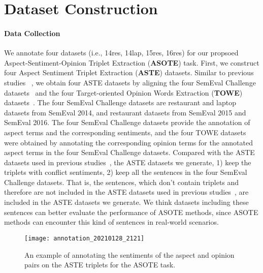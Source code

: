 \documentclass[11pt]{article}
\begin{document}
\section{Dataset Construction}
\paragraph{Data Collection} We annotate four datasets (i.e., 14res, 14lap, 15res, 16res) for our propsoed Aspect-Sentiment-Opinion Triplet Extraction (\textbf{ASOTE}) task. First, we construct four Aspect Sentiment Triplet Extraction (\textbf{ASTE}) datasets. Similar to previous studies ~\cite{Peng2020KnowingWH,xu-etal-2020-position}, we obtain four ASTE datasets by aligning the four SemEval Challenge datasets~\citep{pontiki-etal-2015-semeval, pontiki-etal-2016-semeval} and the four Target-oriented Opinion Words Extraction (\textbf{TOWE}) datasets~\citep{fan2019target}. The four SemEval Challenge datasets are restaurant and laptop datasets from SemEval 2014, and restaurant datasets from SemEval 2015 and SemEval 2016. The four SemEval Challenge datasets provide the annotation of aspect terms and the corresponding sentiments, and  the four TOWE datasets were obtained  by annotating the corresponding opinion terms for the annotated aspect terms in the four SemEval Challenge datasets. Compared with the ASTE datasets used in previous  studies~\cite{Peng2020KnowingWH, xu-etal-2020-position},  the ASTE datasets we generate, 1) keep the triplets with conflict sentiments, 2) keep all the sentences in the four SemEval Challenge datasets. That is, the sentences, which don't contain triplets and therefore are not included in the ASTE datasets used in previous  studies~\cite{Peng2020KnowingWH, xu-etal-2020-position}, are included in the ASTE datasets we generate. We think datasets including these sentences can better evaluate the performance of ASOTE methods, since ASOTE methods can encounter this kind of sentences in real-world scenarios. 

\begin{figure}
	\centering
	\texttt{[image: annotation\_20210128\_2121]}
	\caption{An example of annotating the sentiments of the aspect and opinion pairs on the ASTE triplets for the ASOTE task.}
	\label{fig:annotation}
\end{figure}
\end{document}
